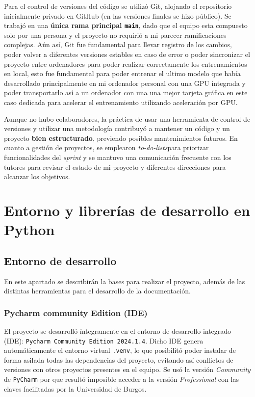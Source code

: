 Para el control de versiones del código se utilizó Git, alojando el repositorio inicialmente privado en GitHub (en las versiones finales se hizo público). Se trabajó en una \textbf{única rama principal \texttt{main}}, dado que el equipo esta compuesto solo por una persona y el proyecto no requirió a mi parecer ramificaciones complejas. Aún así, Git fue fundamental para llevar registro de los cambios, poder volver a diferentes versiones estables en caso de error o poder sincronizar el proyecto entre ordenadores para poder realizar correctamente los entrenamientos en local, esto fue fundamental para poder entrenar el ultimo modelo que había desarrollado principalmente en mi ordenador personal con una GPU integrada y poder transportarlo así a un ordenador con una una mejor tarjeta gráfica en este caso dedicada para acelerar el entrenamiento utilizando aceleración por GPU.

Aunque no hubo colaboradores, la práctica de usar una herramienta de control de versiones y utilizar una metodología contribuyó a mantener un código y un proyecto \textbf{bien estructurado}, previendo posibles mantenimientos futuros. En cuanto a gestión de proyectos, se emplearon \textit{to-do-lists}para priorizar funcionalidades del \textit{sprint} y se mantuvo una comunicación frecuente con los tutores para revisar el estado de mi proyecto y diferentes direcciones para alcanzar los objetivos.

\section{Entorno y librerías de desarrollo en Python}\label{Entorno-y-librerias-de-desarrollo-en-python}

\subsection{Entorno de desarrollo}
En este apartado se describirán la bases para realizar el proyecto, además de las distintas herramientas para el desarrollo de la documentación.  

\subsubsection{Pycharm community Edition (IDE)}


El proyecto se desarrolló íntegramente en el entorno de desarrollo integrado (IDE): \texttt{Pycharm Community Edition 2024.1.4}. Dicho IDE genera automáticamente el entorno virtual \texttt{.venv}, lo que posibilitó poder instalar de forma asilada todas las dependencias del proyecto, evitando así conflictos de versiones con otros proyectos presentes en el equipo. Se usó la versión \textit{Community} de \texttt{PyCharm} por que resultó imposible acceder a la versión \textit{Professional} con las claves facilitadas por la Universidad de Burgos. 

